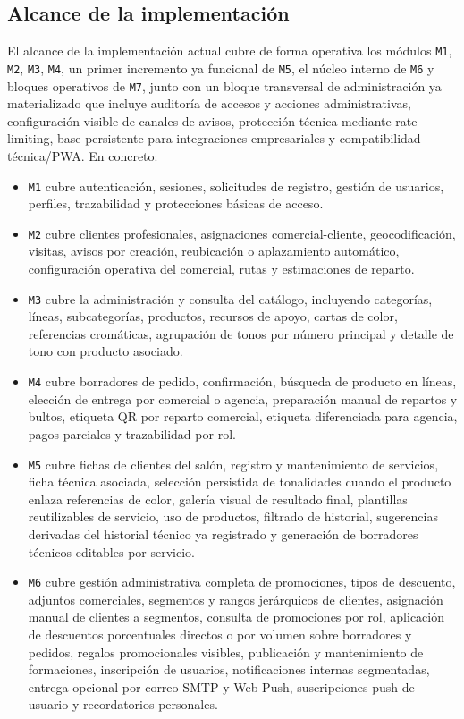 \subsection{Alcance de la implementación}
El alcance de la implementación actual cubre de forma operativa los módulos \texttt{M1}, \texttt{M2}, \texttt{M3}, \texttt{M4}, un primer incremento ya funcional de \texttt{M5}, el núcleo interno de \texttt{M6} y bloques operativos de \texttt{M7}, junto con un bloque transversal de administración ya materializado que incluye auditoría de accesos y acciones administrativas, configuración visible de canales de avisos, protección técnica mediante rate limiting, base persistente para integraciones empresariales y compatibilidad técnica/PWA. En concreto:

\begin{itemize}
    \item \texttt{M1} cubre autenticación, sesiones, solicitudes de registro, gestión de usuarios, perfiles, trazabilidad y protecciones básicas de acceso.
    \item \texttt{M2} cubre clientes profesionales, asignaciones comercial-cliente, geocodificación, visitas, avisos por creación, reubicación o aplazamiento automático, configuración operativa del comercial, rutas y estimaciones de reparto.
    \item \texttt{M3} cubre la administración y consulta del catálogo, incluyendo categorías, líneas, subcategorías, productos, recursos de apoyo, cartas de color, referencias cromáticas, agrupación de tonos por número principal y detalle de tono con producto asociado.
    \item \texttt{M4} cubre borradores de pedido, confirmación, búsqueda de producto en líneas, elección de entrega por comercial o agencia, preparación manual de repartos y bultos, etiqueta QR por reparto comercial, etiqueta diferenciada para agencia, pagos parciales y trazabilidad por rol.
    \item \texttt{M5} cubre fichas de clientes del salón, registro y mantenimiento de servicios, ficha técnica asociada, selección persistida de tonalidades cuando el producto enlaza referencias de color, galería visual de resultado final, plantillas reutilizables de servicio, uso de productos, filtrado de historial, sugerencias derivadas del historial técnico ya registrado y generación de borradores técnicos editables por servicio.
    \item \texttt{M6} cubre gestión administrativa completa de promociones, tipos de descuento, adjuntos comerciales, segmentos y rangos jerárquicos de clientes, asignación manual de clientes a segmentos, consulta de promociones por rol, aplicación de descuentos porcentuales directos o por volumen sobre borradores y pedidos, regalos promocionales visibles, publicación y mantenimiento de formaciones, inscripción de usuarios, notificaciones internas segmentadas, entrega opcional por correo SMTP y Web Push, suscripciones push de usuario y recordatorios personales.

\end{itemize}
